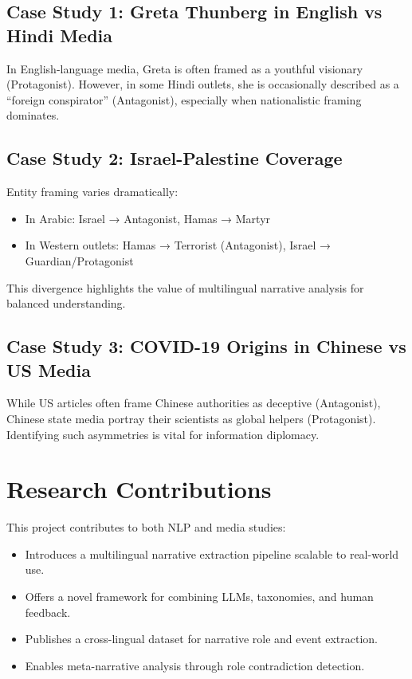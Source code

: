 \documentclass[12pt]{article}
\begin{document}
\subsection{Case Study 1: Greta Thunberg in English vs Hindi Media}

In English-language media, Greta is often framed as a youthful visionary (Protagonist). However, in some Hindi outlets, she is occasionally described as a “foreign conspirator” (Antagonist), especially when nationalistic framing dominates.

\subsection{Case Study 2: Israel-Palestine Coverage}

Entity framing varies dramatically:
\begin{itemize}
    \item In Arabic: Israel → Antagonist, Hamas → Martyr
    \item In Western outlets: Hamas → Terrorist (Antagonist), Israel → Guardian/Protagonist
\end{itemize}

This divergence highlights the value of multilingual narrative analysis for balanced understanding.

\subsection{Case Study 3: COVID-19 Origins in Chinese vs US Media}

While US articles often frame Chinese authorities as deceptive (Antagonist), Chinese state media portray their scientists as global helpers (Protagonist). Identifying such asymmetries is vital for information diplomacy.

\section{Research Contributions}

This project contributes to both NLP and media studies:
\begin{itemize}
    \item Introduces a multilingual narrative extraction pipeline scalable to real-world use.
    \item Offers a novel framework for combining LLMs, taxonomies, and human feedback.
    \item Publishes a cross-lingual dataset for narrative role and event extraction.
    \item Enables meta-narrative analysis through role contradiction detection.
\end{itemize}
\end{document}
